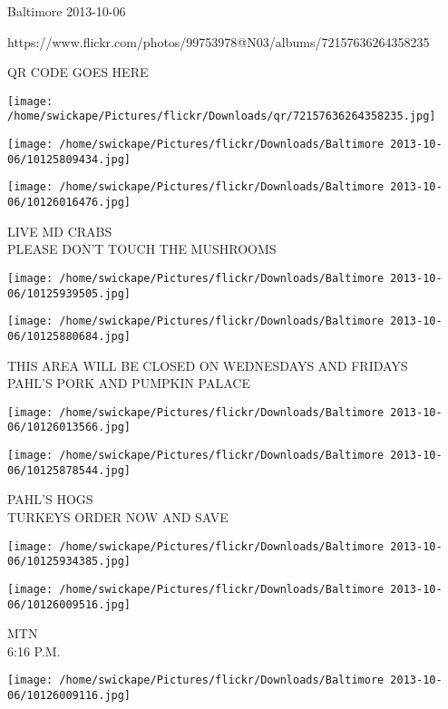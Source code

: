 \documentclass[10pt,letterpaper]{article}
\begin{document}
Baltimore 2013-10-06

https://www.flickr.com/photos/99753978@N03/albums/72157636264358235

QR CODE GOES HERE

\texttt{[image: /home/swickape/Pictures/flickr/Downloads/qr/72157636264358235.jpg]}
\pagebreak

\texttt{[image: /home/swickape/Pictures/flickr/Downloads/Baltimore 2013-10-06/10125809434.jpg]}

\vspace{0.25in}
\texttt{[image: /home/swickape/Pictures/flickr/Downloads/Baltimore 2013-10-06/10126016476.jpg]}

LIVE MD CRABS\\
PLEASE DON'T TOUCH THE MUSHROOMS\\
\pagebreak

\texttt{[image: /home/swickape/Pictures/flickr/Downloads/Baltimore 2013-10-06/10125939505.jpg]}

\vspace{0.25in}
\texttt{[image: /home/swickape/Pictures/flickr/Downloads/Baltimore 2013-10-06/10125880684.jpg]}

THIS AREA WILL BE CLOSED ON WEDNESDAYS AND FRIDAYS\\
PAHL'S PORK AND PUMPKIN PALACE\\
\pagebreak

\texttt{[image: /home/swickape/Pictures/flickr/Downloads/Baltimore 2013-10-06/10126013566.jpg]}

\vspace{0.25in}
\texttt{[image: /home/swickape/Pictures/flickr/Downloads/Baltimore 2013-10-06/10125878544.jpg]}

PAHL'S HOGS\\
TURKEYS ORDER NOW AND SAVE\\
\pagebreak

\texttt{[image: /home/swickape/Pictures/flickr/Downloads/Baltimore 2013-10-06/10125934385.jpg]}

\vspace{0.25in}
\texttt{[image: /home/swickape/Pictures/flickr/Downloads/Baltimore 2013-10-06/10126009516.jpg]}

MTN\\
6:16 P.M.\\
\pagebreak

\texttt{[image: /home/swickape/Pictures/flickr/Downloads/Baltimore 2013-10-06/10126009116.jpg]}
\end{document}
